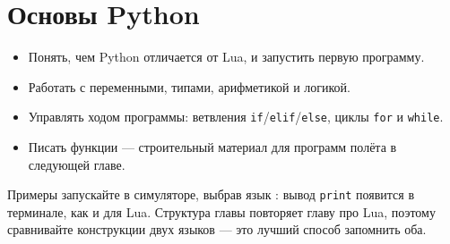 \section{Основы Python}
\label{sec:python_programming}

\begin{infobox}
\begin{itemize}
    \item Понять, чем Python отличается от Lua, и запустить первую программу.
    \item Работать с переменными, типами, арифметикой и логикой.
    \item Управлять ходом программы: ветвления \texttt{if}/\texttt{elif}/\texttt{else}, циклы \texttt{for} и \texttt{while}.
    \item Писать функции --- строительный материал для программ полёта в следующей главе.
\end{itemize}
\end{infobox}

\begin{rulebox}
Примеры запускайте в симуляторе, выбрав язык : вывод \verb|print| появится в терминале, как и для Lua. Структура главы повторяет главу про Lua, поэтому сравнивайте конструкции двух языков --- это лучший способ запомнить оба.
\end{rulebox}
